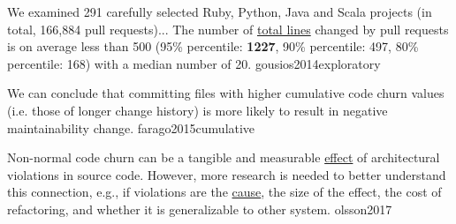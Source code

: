 \documentclass{article}
\begin{document}
  {We examined 291 carefully selected Ruby, Python, Java and Scala projects (in total, 166,884 pull requests)... The number of \ul{total lines} changed by pull requests is on average less than 500 (95\% percentile: \textbf{1227}, 90\% percentile: 497, 80\% percentile: 168) with a median number of 20.}
  {gousios2014exploratory}

  {We can conclude that committing files with higher cumulative code churn values (i.e. those of longer change history) is more likely to result in negative maintainability change.}
  {farago2015cumulative}

  {Non-normal code churn can be a tangible and measurable \ul{effect} of architectural violations in source code. However, more research is needed to better understand this connection, e.g., if violations are the \ul{cause}, the size of the effect, the cost of refactoring, and whether it is generalizable to other system.}
  {olsson2017}

\end{document}
